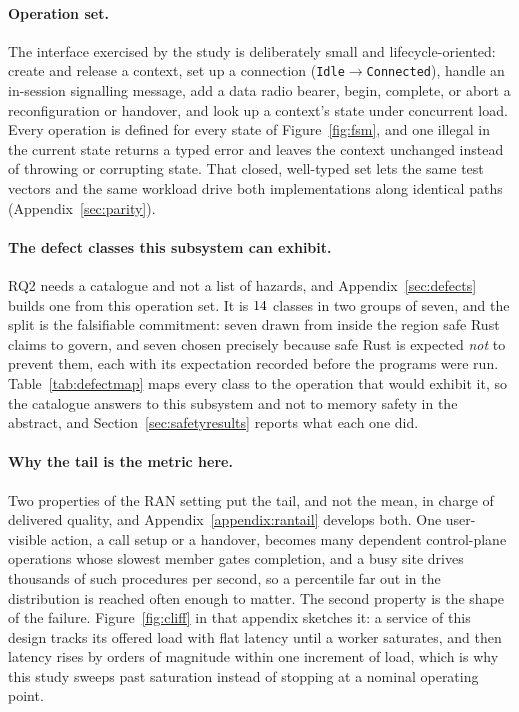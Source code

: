 \documentclass[english,oneside,a4paper,censored,csm,software-track-2020]{HYthesisML}
\begin{document}
\paragraph{Operation set.}
The interface exercised by the study is deliberately small and lifecycle-oriented: create and
release a context, set up a connection (\texttt{Idle}$\rightarrow$\texttt{Connected}), handle an
in-session signalling message, add a data radio bearer, begin, complete, or abort a
reconfiguration or handover, and look up a context's state under concurrent load. Every
operation is defined for every state of Figure~\ref{fig:fsm}, and one illegal in the current
state returns a typed error and leaves the context unchanged instead of throwing or corrupting
state. That closed, well-typed set lets the same test vectors and the same workload drive both
implementations along identical paths (Appendix~\ref{sec:parity}).

\paragraph{The defect classes this subsystem can exhibit.}
RQ2 needs a catalogue and not a list of hazards, and Appendix~\ref{sec:defects} builds one
from this operation set. It is $14$ classes in two groups of seven, and the split is
the falsifiable commitment: seven drawn from inside the region safe Rust claims to govern, and
seven chosen precisely because safe Rust is expected \emph{not} to prevent them, each with its
expectation recorded before the programs were run. Table~\ref{tab:defectmap} maps every class to
the operation that would exhibit it, so the catalogue answers to this subsystem and not to memory
safety in the abstract, and Section~\ref{sec:safetyresults} reports what each one did.

\paragraph{Why the tail is the metric here.}
Two properties of the RAN setting put the tail, and not the mean, in charge of delivered quality,
and Appendix~\ref{appendix:rantail} develops both. One user-visible action, a
call setup or a handover, becomes many dependent control-plane operations whose slowest member
gates completion, and a busy site drives thousands of such procedures per second, so a percentile
far out in the distribution is reached often enough to matter. The second property is the shape of
the failure. Figure~\ref{fig:cliff} in that appendix sketches it: a service of this design tracks
its offered load with flat latency until a worker saturates, and then latency rises by orders of
magnitude within one increment of load, which is why this study sweeps past saturation instead of
stopping at a nominal operating point.
\end{document}
